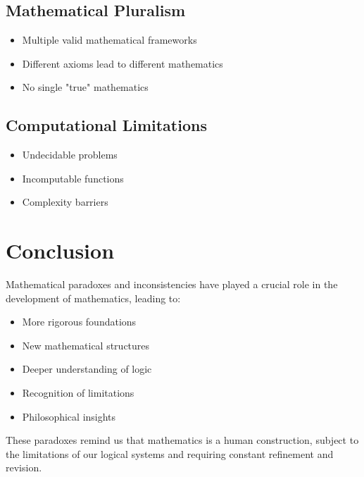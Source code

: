 \documentclass[11pt]{article}
\theoremstyle{definition}
\begin{document}
\subsection{Mathematical Pluralism}
\begin{itemize}
    \item Multiple valid mathematical frameworks
    \item Different axioms lead to different mathematics
    \item No single "true" mathematics
\end{itemize}

\subsection{Computational Limitations}
\begin{itemize}
    \item Undecidable problems
    \item Incomputable functions
    \item Complexity barriers
\end{itemize}

\section{Conclusion}

Mathematical paradoxes and inconsistencies have played a crucial role in the development of mathematics, leading to:

\begin{itemize}
    \item More rigorous foundations
    \item New mathematical structures
    \item Deeper understanding of logic
    \item Recognition of limitations
    \item Philosophical insights
\end{itemize}

These paradoxes remind us that mathematics is a human construction, subject to the limitations of our logical systems and requiring constant refinement and revision.
\end{document}
